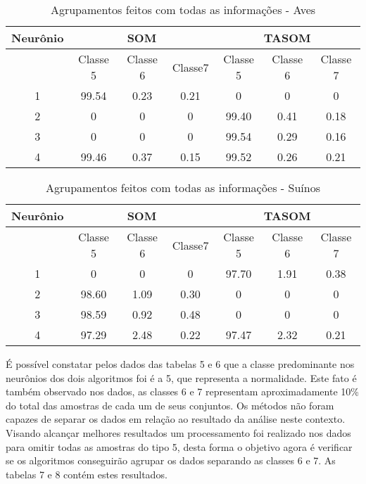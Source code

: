 \begin{table}[h]
\centering
\caption{Agrupamentos feitos com todas as informações - Aves}
\label{my-label}
\begin{tabular}{|c|c|c|c|c|c|c|}
\hline
Neurônio & \multicolumn{3}{c|}{SOM}      & \multicolumn{3}{c|}{TASOM}     \\ \hline
         & Classe 5 & Classe 6 & Classe7 & Classe 5 & Classe 6 & Classe 7 \\ \hline
1        & 99.54    & 0.23     & 0.21    & 0        & 0        & 0        \\ \hline
2        & 0        & 0        & 0       & 99.40    & 0.41     & 0.18     \\ \hline
3        & 0        & 0        & 0       & 99.54    & 0.29     & 0.16     \\ \hline
4        & 99.46    & 0.37     & 0.15    & 99.52    & 0.26     & 0.21     \\ \hline
\end{tabular}
\end{table}

\begin{table}[h]
\centering
\caption{Agrupamentos feitos com todas as informações - Suínos}
\label{my-label}
\begin{tabular}{|c|c|c|c|c|c|c|}
\hline
Neurônio & \multicolumn{3}{c|}{SOM}      & \multicolumn{3}{c|}{TASOM}     \\ \hline
         & Classe 5 & Classe 6 & Classe7 & Classe 5 & Classe 6 & Classe 7 \\ \hline
1        & 0        & 0        & 0       & 97.70    & 1.91     & 0.38     \\ \hline
2        & 98.60    & 1.09     & 0.30    & 0        & 0        & 0        \\ \hline
3        & 98.59    & 0.92     & 0.48    & 0        & 0        & 0        \\ \hline
4        & 97.29    & 2.48     & 0.22    & 97.47    & 2.32     & 0.21     \\ \hline
\end{tabular}
\end{table}

É possível constatar pelos dados das tabelas 5 e 6 que a classe predominante nos neurônios dos dois algoritmos foi é a 5, que representa a normalidade. Este fato é também observado nos dados, as classes 6 e 7 representam aproximadamente 10\% do total das amostras de cada um de seus conjuntos. Os métodos não foram capazes de separar os dados em relação ao resultado da análise neste contexto. Visando alcançar melhores resultados um processamento foi realizado nos dados para omitir todas as amostras do tipo 5, desta forma o objetivo agora é verificar se os algoritmos conseguirão agrupar os dados separando as classes 6 e 7. As tabelas 7 e 8 contém estes resultados.

